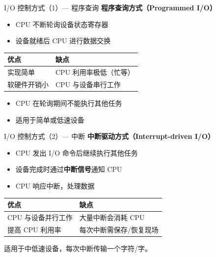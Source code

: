 \documentclass[10pt, aspectratio=169]{beamer}
\begin{document}
\begin{frame}{I/O 控制方式（1）--- 程序查询}
    \textbf{程序查询方式（Programmed I/O）}
    \begin{itemize}
        \item CPU 不断轮询设备状态寄存器
        \item 设备就绪后 CPU 进行数据交换
    \end{itemize}
    \vspace{0.5em}
    \begin{center}
        \begin{tabular}{|l|l|}
            \hline
            \textbf{优点} & \textbf{缺点} \\
            \hline
            实现简单 & CPU 利用率极低（忙等） \\
            软硬件开销小 & CPU 与设备串行工作 \\
            \hline
        \end{tabular}
    \end{center}
    \vspace{0.5em}
    \begin{itemize}
        \item CPU 在轮询期间不能执行其他任务
        \item 适用于简单或低速设备
    \end{itemize}
\end{frame}

\begin{frame}{I/O 控制方式（2）--- 中断}
    \textbf{中断驱动方式（Interrupt-driven I/O）}
    \begin{itemize}
        \item CPU 发出 I/O 命令后继续执行其他任务
        \item 设备完成时通过\textbf{中断信号}通知 CPU
        \item CPU 响应中断，处理数据
    \end{itemize}
    \vspace{0.5em}
    \begin{center}
        \begin{tabular}{|l|l|}
            \hline
            \textbf{优点} & \textbf{缺点} \\
            \hline
            CPU 与设备并行工作 & 大量中断会消耗 CPU \\
            提高 CPU 利用率 & 每次中断需保存/恢复现场 \\
            \hline
        \end{tabular}
    \end{center}
    \vspace{0.5em}
    适用于中低速设备，每次中断传输一个字符/字。
\end{frame}
\end{document}
